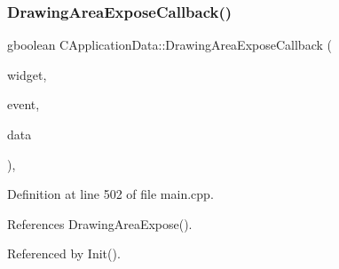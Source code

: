 \subsubsection{\texorpdfstring{Drawing\+Area\+Expose\+Callback()}{DrawingAreaExposeCallback()}}
{\footnotesize\ttfamily gboolean C\+Application\+Data\+::\+Drawing\+Area\+Expose\+Callback (\begin{DoxyParamCaption}\item[{Gtk\+Widget $\ast$}]{widget,  }\item[{Gdk\+Event\+Expose $\ast$}]{event,  }\item[{gpointer}]{data }\end{DoxyParamCaption})\hspace{0.3cm}{\ttfamily [static]}, {\ttfamily [protected]}}



Definition at line 502 of file main.\+cpp.



References Drawing\+Area\+Expose().



Referenced by Init().


